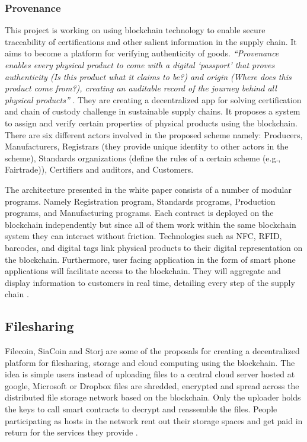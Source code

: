 \subsubsection{Provenance}
This project is working on using blockchain technology to enable secure traceability of certifications and other salient information in the supply chain. It aims to become a platform for verifying authenticity of goods. \textit{“Provenance enables every physical product to come with a digital ‘passport’ that proves authenticity (Is this product what it claims to be?) and origin (Where does this product come from?), creating an auditable record of the journey behind all physical products”} \cite{paper:006}. They are creating a decentralized app for solving certification and chain of custody challenge in sustainable supply chains. It proposes a system to assign and verify certain properties of physical products using the blockchain. There are six different actors involved in the proposed scheme namely: Producers, Manufacturers, Registrars (they provide unique identity to other actors in the scheme), Standards organizations (define the rules of a certain scheme (e.g., Fairtrade)), Certifiers and auditors, and Customers.

The architecture presented in the white paper \cite{paper:006} consists of a number of modular programs. Namely Registration program, Standards programs, Production programs, and Manufacturing programs. Each contract is deployed on the blockchain independently but since all of them work within the same blockchain system they can interact without friction. Technologies such as NFC, RFID, barcodes, and digital tags link physical products to their digital representation on the blockchain. Furthermore, user facing application in the form of smart phone applications will facilitate access to the blockchain. They will aggregate and display information to customers in real time, detailing every step of the supply chain \cite{paper:006}.
\vspace{0.3cm}  
\subsection{Filesharing}
Filecoin, SiaCoin and Storj are some of the proposals for creating a decentralized platform for filesharing, storage and cloud computing using the blockchain. The idea is simple users instead of uploading files to a central cloud server hosted at google, Microsoft or Dropbox files are shredded, encrypted and spread across the distributed file storage network based on the blockchain. Only the uploader holds the keys to call smart contracts to decrypt and reassemble the files. People participating as hosts in the network rent out their storage spaces and get paid in return for the services they provide \cite{misc:016}.
